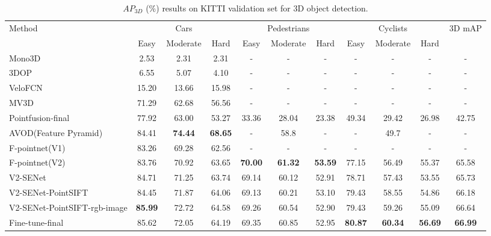 \documentclass[letterpaper]{article}
\begin{document}
\begin{table}[h]
\scriptsize
\centering
\begin{tabular}{l|c|c|c|c|c|c|c|c|c|c}
\hline
\multirow{2}{*}{Method} & \multicolumn{3}{c|}{Cars} &
\multicolumn{3}{c|}{Pedestrians} & \multicolumn{3}{c|}{Cyclists} & \multicolumn{1}{c}{\multirow{2}{*}{3D mAP}} \\
\cline{2-10}

& Easy & Moderate & Hard & Easy & Moderate & Hard & Easy & Moderate & Hard & \multicolumn{1}{c}{} \\
\hline
\hline
Mono3D~\cite{chen2016monocular} &2.53 &2.31 &2.31 &- &- &- &- &- &- &- \\
3DOP~\cite{chen20153d}   &6.55 &5.07 &4.10 &- &- &- &- &- &- &- \\
VeloFCN~\cite{li20173d}	 		            & 15.20 & 13.66 & 15.98 & - & - & - & -  & - & - & - \\
MV3D~\cite{chen2017multi} 	                    & 71.29 & 62.68 & 56.56 & - & - & - & -  & - & - & - \\
Pointfusion-final~\cite{xu2017pointfusion}  			& 77.92 & 63.00 & 53.27 & 33.36 & 28.04 & 23.38 & 49.34  & 29.42 & 26.98 & 42.75\\
AVOD(Feature Pyramid)~\cite{ku2018joint}   &84.41  &\textbf{74.44}  &\textbf{68.65}   &-  &58.8  &-  &- &49.7 &-  &-\\
F-pointnet(V1)~\cite{qi2017frustum}				    & 83.26 & 69.28 & 62.56 & - & - & - & -  & - & - & -\\
F-pointnet(V2)~\cite{qi2017frustum}	 			    & 83.76 & 70.92 & 63.65 & \textbf{70.00} & \textbf{61.32} & \textbf{53.59} & 77.15  & 56.49 & 55.37 & 65.58\\
\hline
V2-SENet			        & 84.71 & 71.25 & 63.74 & 69.14 & 60.12 & 52.91 & 78.71  & 57.43 & 53.55 & 65.73\\
V2-SENet-PointSIFT			& 84.45 & 71.87 & 64.06 & 69.13 & 60.21 & 53.10 & 79.43  & 58.55 & 54.86 & 66.18\\
V2-SENet-PointSIFT-rgb-image   &\textbf{85.99} &72.72 &64.58 &69.26 &60.54 &52.90 &79.43 &59.26 &55.09 &66.64 \\
Fine-tune-final 	& 85.62 &72.05 &64.19 & 69.35 & 60.85
                & 52.95 & \textbf{80.87}  & \textbf{60.34} & \textbf{56.69} & \textbf{66.99}\\
\hline
\end{tabular}
\caption{$AP_{3D}$ (\%) results on KITTI validation set for 3D object detection.}
\label{T1}
\end{table}
\end{document}
